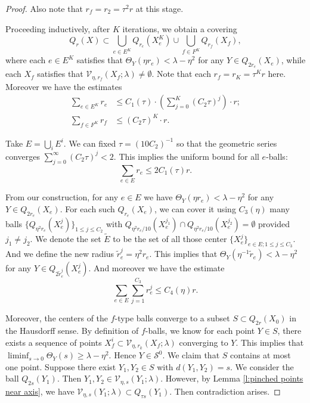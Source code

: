 \documentclass[11pt,reqno]{amsart}
\numberwithin{equation}{section}
\newcommand{\cS}{\mathcal{S}}
\newcommand{\cV}{\mathcal{V}}
\theoremstyle{definition}
\theoremstyle{remark}
\theoremstyle{remark}
\theoremstyle{remark}
\theoremstyle{remark}\newtheorem{conjecture}[equation]{Conjecture}
\theoremstyle{remark}\newtheorem{question}[equation]{Question}
\begin{document}
\begin{proof}
Also note that $r_f = r_2 = \tau^2 r$ at this stage. 

Proceeding inductively, after $K$ iterations, we obtain a covering
\begin{equation*}
        Q_r(X) \subset \bigcup_{e \in E^K} Q_{r_e}(X^K_e) \cup \bigcup_{f \in F^K}Q_{r_f}(X_f),
    \end{equation*}
where each $e\in E^K$ satisfies that $\Theta_Y(\eta r_e) < \lambda - \eta^2$ for any $Y \in Q_{2r_e}(X_e)$, while each $X_f$ satisfies that $\cV_{\eta,r_f}(X_f;\lambda) \neq \emptyset$. Note that each $r_f = r_K = \tau^K r$ here. Moreover we have the estimates
\begin{equation*}
\begin{split}
    \sum_{e \in E^K} r_e &\le  C_1(\tau) \cdot(\sum_{j=0}^K (C_2 \tau)^j) \cdot r ;\\
    \sum_{f \in F^K} r_f &\le (C_2 \tau)^K \cdot r.
\end{split}
\end{equation*}

Take $E = \bigcup_i E^i$. We can fixed $\tau = (10 C_2)^{-1}$ so that the geometric series converges $\sum_{j=0}^{\infty} (C_2 \tau)^j < 2$. This implies the uniform bound for all $e$-balls: 
\begin{equation*}
    \sum_{e\in E} r_e \le 2 C_1(\tau) r.
\end{equation*}

From our construction, for any $e\in E$ we have $\Theta_Y(\eta r_e) < \lambda -\eta^2$ for any $Y \in Q_{2r_e}(X_e)$. For each such $Q_{r_e}(X_e)$, we can cover it using $C_3(\eta)$ many balls $\{Q_{\eta^2 r_e}(X_e^j)\}_{1 \le j \le C_2}$ with $Q_{\eta^2 r_e/10}(X_e^{j_1}) \cap Q_{\eta^2 r_e /10}(X_e^{j_2}) = \emptyset$ provided $j_1 \neq j_2$. We denote the set $\tilde{E}$ to be the set of all those center $\{X_e^j\}_{e\in E; 1\le j \le C_3}$. And we define the new radius $\tilde{r}_e^j = \eta^2 r_e$. This implies that $\Theta_Y(\eta^{-1} \tilde{r}_e) < \lambda - \eta^2$ for any $Y \in Q_{2 \tilde{r}^j_e}(X^j_e)$. And moreover we have the estimate
\begin{equation*}
    \sum_{e\in E} \sum_{j=1}^{C_3}  r_e^j \le C_4(\eta)r.
\end{equation*}

Moreover, the centers of the $f$-type balls converge to a subset $S \subset Q_{2r}(X_0)$ in the Hausdorff sense. By definition of $f$-balls, we know for each point $Y \in S$, there exists a sequence of points $X^i_f \subset \cV_{\eta,r_k}(X_f;\lambda)$ converging to $Y$. This implies that $\liminf_{s\to 0}\Theta_Y(s) \ge \lambda -\eta^2.$ Hence $Y \in \cS^0$. We claim that $S$ contains at most one point. Suppose there exist $Y_1, Y_2 \in S$ with $d(Y_1,Y_2) = s$. We consider the ball $Q_{2s}(Y_1)$. Then $Y_1,Y_2 \in \cV_{\eta,s}(Y_1;\lambda)$. However, by Lemma \ref{l:pinched points near axis}, we have $\cV_{\eta,s}(Y_1;\lambda) \subset Q_{\tau s}(Y_1)$. Then contradiction arises.    
\end{proof}
\end{document}
